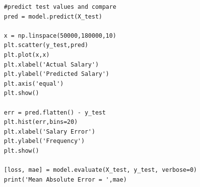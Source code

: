 \documentclass[11pt]{article}
\begin{document}
\begin{lstlisting}
#predict test values and compare
pred = model.predict(X_test)

x = np.linspace(50000,180000,10)
plt.scatter(y_test,pred)
plt.plot(x,x)
plt.xlabel('Actual Salary')
plt.ylabel('Predicted Salary')
plt.axis('equal')
plt.show()

err = pred.flatten() - y_test
plt.hist(err,bins=20)
plt.xlabel('Salary Error')
plt.ylabel('Frequency')
plt.show()

[loss, mae] = model.evaluate(X_test, y_test, verbose=0)
print('Mean Absolute Error = ',mae)
\end{lstlisting}
\end{document}

